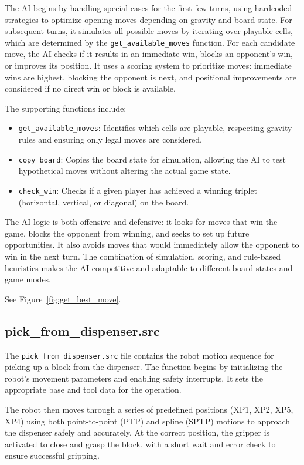 \documentclass{article}
\begin{document}
            The AI begins by handling special cases for the first few turns, using hardcoded strategies to optimize opening moves depending on gravity and board state. For subsequent turns, it simulates all possible moves by iterating over playable cells, which are determined by the \texttt{get\_available\_moves} function. For each candidate move, the AI checks if it results in an immediate win, blocks an opponent's win, or improves its position. It uses a scoring system to prioritize moves: immediate wins are highest, blocking the opponent is next, and positional improvements are considered if no direct win or block is available.

            The supporting functions include:
            \begin{itemize}
                \item \texttt{get\_available\_moves}: Identifies which cells are playable, respecting gravity rules and ensuring only legal moves are considered.
                \item \texttt{copy\_board}: Copies the board state for simulation, allowing the AI to test hypothetical moves without altering the actual game state.
                \item \texttt{check\_win}: Checks if a given player has achieved a winning triplet (horizontal, vertical, or diagonal) on the board.
            \end{itemize}

            The AI logic is both offensive and defensive: it looks for moves that win the game, blocks the opponent from winning, and seeks to set up future opportunities. It also avoids moves that would immediately allow the opponent to win in the next turn. The combination of simulation, scoring, and rule-based heuristics makes the AI competitive and adaptable to different board states and game modes.

            See Figure~\ref{fig:get_best_move}.

        \subsection{pick\_from\_dispenser.src}
            The \texttt{pick\_from\_dispenser.src} file contains the robot motion sequence for picking up a block from the dispenser. The function begins by initializing the robot's movement parameters and enabling safety interrupts. It sets the appropriate base and tool data for the operation.

            The robot then moves through a series of predefined positions (XP1, XP2, XP5, XP4) using both point-to-point (PTP) and spline (SPTP) motions to approach the dispenser safely and accurately. At the correct position, the gripper is activated to close and grasp the block, with a short wait and error check to ensure successful gripping.
\end{document}
